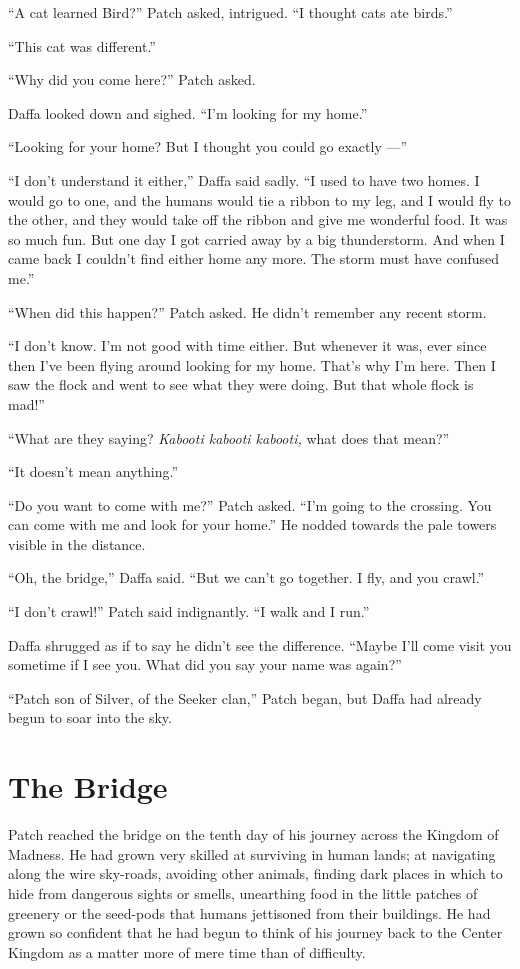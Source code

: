 \documentclass[ebook,oneside,openany,17pt]{memoir}
\renewcommand{\thechapter}{\Roman{chapter}}
\newcounter{sections}
\newcommand{\sections}[1]{%
  \section*{#1}
  \addtocounter{sections}{1}%
  \pdfbookmark[1]{#1}{section.\thechapter.\thesections}}
\begin{document}
“A cat learned Bird?” Patch asked, intrigued. “I thought cats ate
birds.”

“This cat was different.”

“Why did you come here?” Patch asked.

Daffa looked down and sighed. “I’m looking for my home.”

“Looking for your home? But I thought you could go exactly —”

“I don’t understand it either,” Daffa said sadly. “I used to have two
homes. I would go to one, and the humans would tie a ribbon to my leg,
and I would fly to the other, and they would take off the ribbon and
give me wonderful food. It was so much fun. But one day I got carried
away by a big thunderstorm. And when I came back I couldn’t find
either home any more. The storm must have confused me.”

“When did this happen?” Patch asked. He didn’t remember any recent
storm.

“I don’t know. I’m not good with time either. But whenever it was,
ever since then I’ve been flying around looking for my home. That’s
why I’m here. Then I saw the flock and went to see what they were
doing. But that whole flock is mad!”

“What are they saying? \emph{Kabooti kabooti kabooti,} what does
that mean?”

“It doesn’t mean anything.”

“Do you want to come with me?” Patch asked. “I’m going to the
crossing. You can come with me and look for your home.” He nodded
towards the pale towers visible in the distance.

“Oh, the bridge,” Daffa said. “But we can’t go together. I fly, and
you crawl.”

“I don’t crawl!” Patch said indignantly. “I walk and I run.”

Daffa shrugged as if to say he didn’t see the difference. “Maybe I’ll
come visit you sometime if I see you. What did you say your name was
again?”

“Patch son of Silver, of the Seeker clan,” Patch began, but Daffa had
already begun to soar into the sky.


\sections{The Bridge}

Patch reached the bridge on the tenth day of his journey across the
Kingdom of Madness. He had grown very skilled at surviving in human
lands; at navigating along the wire sky-roads, avoiding other animals,
finding dark places in which to hide from dangerous sights or smells,
unearthing food in the little patches of greenery or the seed-pods
that humans jettisoned from their buildings. He had grown so confident
that he had begun to think of his journey back to the Center Kingdom
as a matter more of mere time than of difficulty.
\end{document}
